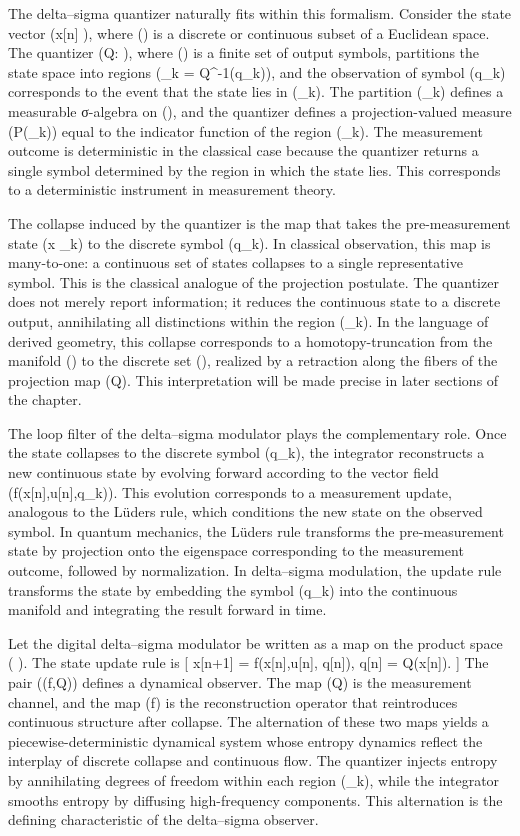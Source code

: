 The delta--sigma quantizer naturally fits within this formalism. Consider the state vector (x[n] \in {}), where () is a discrete or continuous subset of a Euclidean space. The quantizer (Q: \to \Lambda), where (\Lambda) is a finite set of output symbols, partitions the state space into regions (\Omega_k = Q^{-1}(q_k)), and the observation of symbol (q_k) corresponds to the event that the state lies in (\Omega_k). The partition ({\Omega_k}) defines a measurable σ-algebra on (), and the quantizer defines a projection-valued measure (P(\Omega_k)) equal to the indicator function of the region (\Omega_k). The measurement outcome is deterministic in the classical case because the quantizer returns a single symbol determined by the region in which the state lies. This corresponds to a deterministic instrument in measurement theory.

The collapse induced by the quantizer is the map that takes the pre-measurement state (x \in \Omega_k) to the discrete symbol (q_k). In classical observation, this map is many-to-one: a continuous set of states collapses to a single representative symbol. This is the classical analogue of the projection postulate. The quantizer does not merely report information; it reduces the continuous state to a discrete output, annihilating all distinctions within the region (\Omega_k). In the language of derived geometry, this collapse corresponds to a homotopy-truncation from the manifold () to the discrete set (\Lambda), realized by a retraction along the fibers of the projection map (Q). This interpretation will be made precise in later sections of the chapter.

The loop filter of the delta--sigma modulator plays the complementary role. Once the state collapses to the discrete symbol (q_k), the integrator reconstructs a new continuous state by evolving forward according to the vector field (f(x[n],u[n],q_k)). This evolution corresponds to a measurement update, analogous to the Lüders rule, which conditions the new state on the observed symbol. In quantum mechanics, the Lüders rule transforms the pre-measurement state by projection onto the eigenspace corresponding to the measurement outcome, followed by normalization. In delta--sigma modulation, the update rule transforms the state by embedding the symbol (q_k) into the continuous manifold and integrating the result forward in time.

Let the digital delta--sigma modulator be written as a map on the product space ( \times \Lambda). The state update rule is
[
x[n+1] = f(x[n],u[n], q[n]),
\qquad
q[n] = Q(x[n]).
]
The pair ((f,Q)) defines a dynamical observer. The map (Q) is the measurement channel, and the map (f) is the reconstruction operator that reintroduces continuous structure after collapse. The alternation of these two maps yields a piecewise-deterministic dynamical system whose entropy dynamics reflect the interplay of discrete collapse and continuous flow. The quantizer injects entropy by annihilating degrees of freedom within each region (\Omega_k), while the integrator smooths entropy by diffusing high-frequency components. This alternation is the defining characteristic of the delta--sigma observer.

